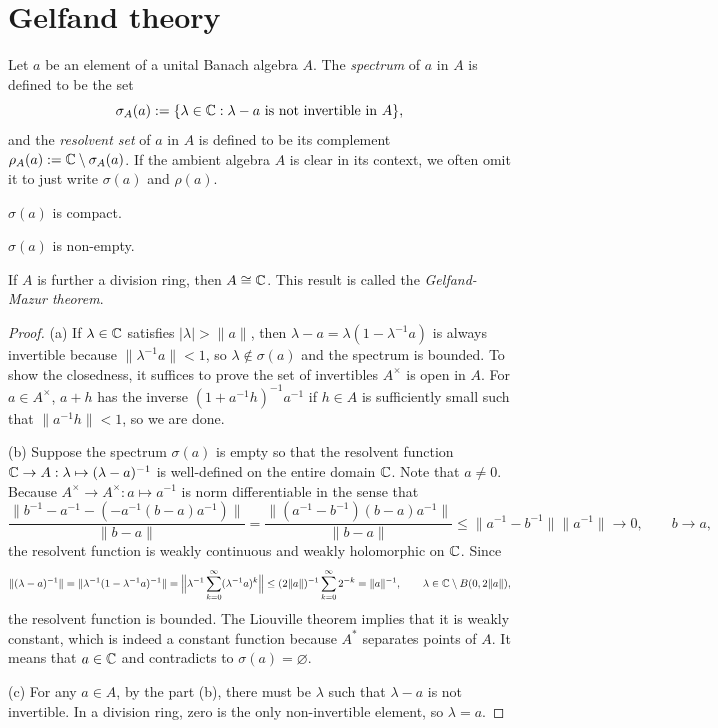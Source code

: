 \documentclass{../../large}
\begin{document}
\section{Gelfand theory}

\begin{prb}
Let $a$ be an element of a unital Banach algebra $A$.
The \emph{spectrum} of $a$ in $A$ is defined to be the set
\[\sigma_A(a):=\{\lambda\in\mathbb{C}:\lambda-a\text{ is not invertible in }A\},\]
and the \emph{resolvent set} of $a$ in $A$ is defined to be its complement $\rho_A(a):=\mathbb{C}\setminus\sigma_A(a)$.
If the ambient algebra $A$ is clear in its context, we often omit it to just write $\sigma(a)$ and $\rho(a)$.
\begin{parts}
\item $\sigma(a)$ is compact.
\item $\sigma(a)$ is non-empty.
\item If $A$ is further a division ring, then $A\cong\mathbb{C}$. This result is called the \emph{Gelfand-Mazur theorem}.
\end{parts}
\end{prb}
\begin{proof}
(a)
If $\lambda\in\mathbb{C}$ satisfies $|\lambda|>\|a\|$, then $\lambda-a=\lambda(1-\lambda^{-1}a)$ is always invertible because $\|\lambda^{-1}a\|<1$, so $\lambda\notin\sigma(a)$ and the spectrum is bounded.
To show the closedness, it suffices to prove the set of invertibles $A^\times$ is open in $A$.
For $a\in A^\times$, $a+h$ has the inverse $(1+a^{-1}h)^{-1}a^{-1}$ if $h\in A$ is sufficiently small such that $\|a^{-1}h\|<1$, so we are done.

(b)
Suppose the spectrum $\sigma(a)$ is empty so that the resolvent function $\mathbb{C}\to A:\lambda\mapsto(\lambda-a)^{-1}$ is well-defined on the entire domain $\mathbb{C}$.
Note that $a\ne0$.
Because $A^\times\to A^\times:a\mapsto a^{-1}$ is norm differentiable in the sense that
\[\frac{\|b^{-1}-a^{-1}-(-a^{-1}(b-a)a^{-1})\|}{\|b-a\|}
=\frac{\|(a^{-1}-b^{-1})(b-a)a^{-1}\|}{\|b-a\|}
\le\|a^{-1}-b^{-1}\|\|a^{-1}\|\to0,\qquad b\to a,\]
the resolvent function is weakly continuous and weakly holomorphic on $\mathbb{C}$.
Since
\[\|(\lambda-a)^{-1}\|=\|\lambda^{-1}(1-\lambda^{-1}a)^{-1}\|
=\Bigl\|\lambda^{-1}\sum_{k=0}^\infty(\lambda^{-1}a)^k\Bigr\|
\le(2\|a\|)^{-1}\sum_{k=0}^\infty2^{-k}=\|a\|^{-1},\qquad\lambda\in\mathbb{C}\setminus B(0,2\|a\|),\]
the resolvent function is bounded.
The Liouville theorem implies that it is weakly constant, which is indeed a constant function because $A^*$ separates points of $A$.
It means that $a\in\mathbb{C}$ and contradicts to $\sigma(a)=\varnothing$.

(c)
For any $a\in A$, by the part (b), there must be $\lambda$ such that $\lambda-a$ is not invertible.
In a division ring, zero is the only non-invertible element, so $\lambda=a$.
\end{proof}
\end{document}
